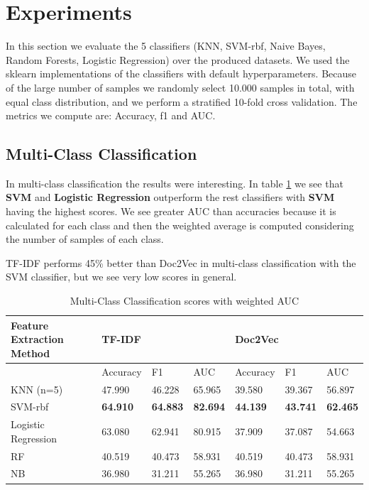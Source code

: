 \documentclass{article}
\begin{document}
\section{Experiments}
In this section we evaluate the 5 classifiers (KNN, SVM-rbf, Naive Bayes, Random Forests, Logistic Regression) 
over the produced datasets. We used the sklearn implementations of the classifiers with default hyperparameters. 
Because of the large number of samples we randomly select 10.000 samples in total, 
with equal class distribution, and we perform a stratified 10-fold cross validation.
The metrics we compute are: Accuracy, f1 and AUC. 

\subsection{Multi-Class Classification}
\label{multiclass}
In multi-class classification the results were interesting. In table \ref{multiscore} we see that 
\textbf{SVM} and \textbf{Logistic Regression} outperform the rest classifiers with 
\textbf{SVM} having the highest scores. We see greater AUC than accuracies because it is 
calculated for each class and then the weighted average is computed considering the number of 
samples of each class.  

TF-IDF performs 45\% better than Doc2Vec in multi-class classification with the SVM classifier, but 
we see very low scores in general.
\begin{table}[h]
  \begin{tabular}{lllllll}
  \hline
  Feature Extraction Method & \multicolumn{3}{l}{TF-IDF}                          & \multicolumn{3}{l}{Doc2Vec}                         \\ \hline
                            & Accuracy        & F1              & AUC             & Accuracy        & F1              & AUC             \\ \hline
  KNN (n=5)                 & 47.990          & 46.228          & 65.965          & 39.580          & 39.367          & 56.897          \\
  SVM-rbf                   & \textbf{64.910} & \textbf{64.883} & \textbf{82.694} & \textbf{44.139} & \textbf{43.741} & \textbf{62.465} \\
  Logistic Regression       & 63.080          & 62.941          & 80.915          & 37.909          & 37.087          & 54.663          \\
  RF                        & 40.519          & 40.473          & 58.931          & 40.519          & 40.473          & 58.931          \\
  NB                        & 36.980          & 31.211          & 55.265          & 36.980          & 31.211          & 55.265          \\ \hline
  \end{tabular}
  \caption{Multi-Class Classification scores with weighted AUC}
  \label{multiscore}
\end{table}
\end{document}
